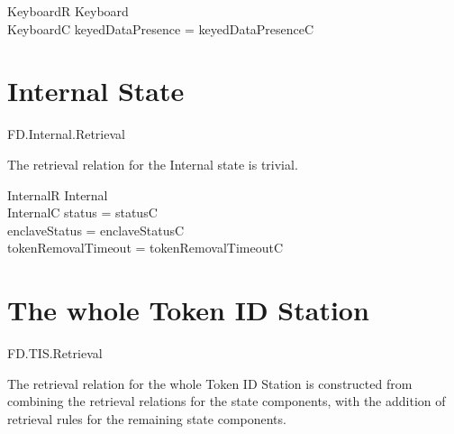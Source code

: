 \begin{schema}{KeyboardR}
        Keyboard
\\      KeyboardC
\where        
        keyedDataPresence = keyedDataPresenceC
\end{schema}  


\section{Internal State}

\begin{traceunit}{FD.Internal.Retrieval}
\end{traceunit}

The retrieval relation for the Internal state is trivial.

\begin{schema}{InternalR}
        Internal
\\      InternalC
\where
        status = statusC
\\      enclaveStatus = enclaveStatusC 
\\      tokenRemovalTimeout = tokenRemovalTimeoutC 
\end{schema}


\section{The whole Token ID Station}

\begin{traceunit}{FD.TIS.Retrieval}
\end{traceunit}


The retrieval relation for the whole Token ID Station is constructed
from combining the retrieval relations for the state components, with
the addition of retrieval rules for the remaining state components.  
 
